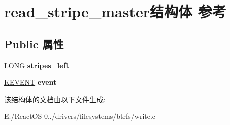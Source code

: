 \hypertarget{structread__stripe__master}{}\section{read\+\_\+stripe\+\_\+master结构体 参考}
\label{structread__stripe__master}
\subsection*{Public 属性}
\begin{DoxyCompactItemize}
\item 
\mbox{\label{structread__stripe__master_ad6c8d6127c8f21def4325ae23dc38eaa}} 
L\+O\+NG {\bfseries stripes\+\_\+left}
\item 
\mbox{\label{structread__stripe__master_a694799f288963cdcb8db4277ff5fce45}} 
\hyperlink{struct___k_e_v_e_n_t}{K\+E\+V\+E\+NT} {\bfseries event}
\end{DoxyCompactItemize}


该结构体的文档由以下文件生成\+:\begin{DoxyCompactItemize}
\item 
E\+:/\+React\+O\+S-\/0../drivers/filesystems/btrfs/write.\+c\end{DoxyCompactItemize}

